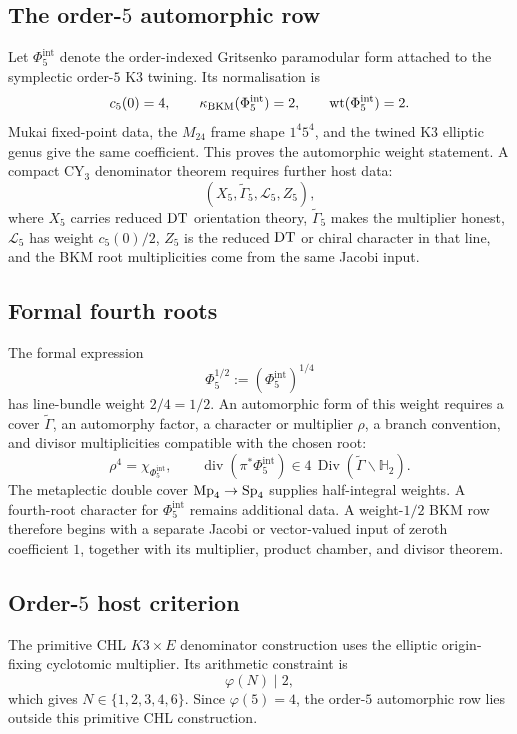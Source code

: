 \subsection*{The order-$5$ automorphic row}

Let \(\Phi_5^{\mathrm{int}}\) denote the order-indexed Gritsenko
paramodular form attached to the symplectic order-$5$ K3 twining.  Its
normalisation is
\[
  c_5(0)=4,\qquad
  \kappa_{\mathrm{BKM}}(\Phi_5^{\mathrm{int}})=2,\qquad
  \operatorname{wt}(\Phi_5^{\mathrm{int}})=2.
\]
Mukai fixed-point data, the \(M_{24}\) frame shape \(1^4 5^4\), and the
twined K3 elliptic genus give the same coefficient.  This proves the
automorphic weight statement.  A compact CY\(_3\) denominator theorem
requires further host data:
\[
  (X_5,\widetilde{\Gamma}_5,\mathcal L_5,Z_5),
\]
where \(X_5\) carries reduced \(\mathrm{DT}\) orientation theory,
\(\widetilde{\Gamma}_5\) makes the multiplier honest,
\(\mathcal L_5\) has weight \(c_5(0)/2\), \(Z_5\) is the reduced
\(\mathrm{DT}\) or chiral character in that line, and the BKM root
multiplicities come from the same Jacobi input.

\subsection*{Formal fourth roots}

The formal expression
\[
  \Phi_5^{1/2}:=(\Phi_5^{\mathrm{int}})^{1/4}
\]
has line-bundle weight \(2/4=1/2\).  An automorphic form of this weight
requires a cover \(\widetilde{\Gamma}\), an automorphy factor, a
character or multiplier \(\rho\), a branch convention, and divisor
multiplicities compatible with the chosen root:
\[
  \rho^4=\chi_{\Phi_5^{\mathrm{int}}},\qquad
  \operatorname{div}(\pi^*\Phi_5^{\mathrm{int}})
  \in 4\,\operatorname{Div}(\widetilde{\Gamma}\backslash\mathbb H_2).
\]
The metaplectic double cover \(\mathrm{Mp}_4\to\mathrm{Sp}_4\) supplies half-integral
weights.  A fourth-root character for \(\Phi_5^{\mathrm{int}}\) remains
additional data.  A weight-\(1/2\) BKM row therefore begins with a
separate Jacobi or vector-valued input of zeroth coefficient \(1\),
together with its multiplier, product chamber, and divisor theorem.

\subsection*{Order-$5$ host criterion}

The primitive CHL \(K3\times E\) denominator construction uses the
elliptic origin-fixing cyclotomic multiplier.  Its arithmetic constraint
is
\[
  \varphi(N)\mid 2,
\]
which gives \(N\in\{1,2,3,4,6\}\).  Since \(\varphi(5)=4\), the
order-$5$ automorphic row lies outside this primitive CHL construction.

